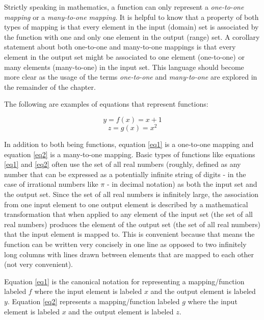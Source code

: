 Strictly speaking in mathematics, a function can only represent a \emph{one-to-one mapping} or a \emph{many-to-one mapping}. It is helpful to know that a property of both types of mapping is that every element in the input (domain) set is associated by the function with one and only one element in the output (range) set. A corollary statement about both one-to-one and many-to-one mappings is that every element in the output set might be associated to one element (one-to-one) or many elements (many-to-one) in the input set. This language should become more clear as the usage of the terms \emph{one-to-one} and \emph{many-to-one} are explored in the remainder of the chapter.

The following are examples of equations that represent functions:

\begin{equation} \label{eq1}
y = f(x) = x + 1
\end{equation}
\begin{equation} \label{eq2}
z = g(x) = x^{2}
\end{equation}

In addition to both being functions, equation \ref{eq1} is a one-to-one mapping and equation \ref{eq2} is a many-to-one mapping. Basic types of functions like equations \ref{eq1} and \ref{eq2} often use the set of all real numbers (roughly, defined as any number that can be expressed as a potentially infinite string of digits - in the case of irrational numbers like \begin{math}\pi\end{math} - in decimal notation) as both the input set and the output set. Since the set of all real numbers is infinitely large, the association from one input element to one output element is described by a mathematical transformation that when applied to any element of the input set (the set of all real numbers) produces the element of the output set (the set of all real numbers) that the input element is mapped to. This is convenient because that means the function can be written very concisely in one line as opposed to two infinitely long columns with lines drawn between elements that are mapped to each other (not very convenient). 

Equation \ref{eq1} is the canonical notation for representing a mapping/function labeled \begin{math}f\end{math} where the input element is labeled \begin{math}x\end{math} and the output element is labeled \begin{math}y\end{math}. Equation \ref{eq2} represents a mapping/function labeled \begin{math}g\end{math} where the input element is labeled \begin{math}x\end{math} and the output element is labeled \begin{math}z\end{math}. 

